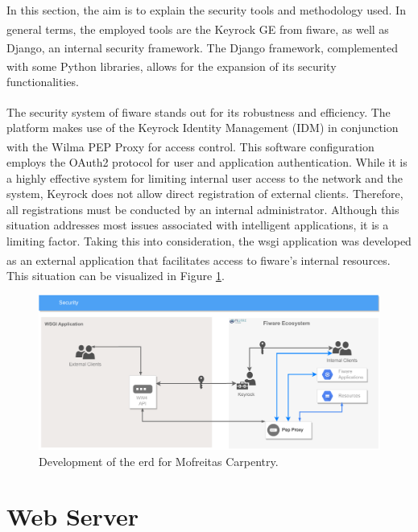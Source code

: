In this section, the aim is to explain the security tools and methodology used. In general terms, the employed tools are the Keyrock GE from \acrshort{fiware}\textsuperscript{\textregistered}, as well as Django\textsuperscript{\textregistered}, an internal security framework. The Django\textsuperscript{\textregistered} framework, complemented with some Python\textsuperscript{\textregistered} libraries, allows for the expansion of its security functionalities.

The security system of \acrshort{fiware}\textsuperscript{\textregistered} stands out for its robustness and efficiency. The platform makes use of the Keyrock Identity Management (IDM) in conjunction with the Wilma PEP Proxy\textsuperscript{\textregistered} for access control. This software configuration employs the OAuth2 protocol for user and application authentication. While it is a highly effective system for limiting internal user access to the network and the system, Keyrock does not allow direct registration of external clients. Therefore, all registrations must be conducted by an internal administrator. Although this situation addresses most issues associated with intelligent applications, it is a limiting factor. Taking this into consideration, the \acrshort{wsgi} application was developed as an external application that facilitates access to \acrshort{fiware}\textsuperscript{\textregistered}'s internal resources. This situation can be visualized in Figure \ref{fig:security}.


\begin{figure}[H]
    \centering
    \includegraphics[width=.95\linewidth]{images/Development/chap3/Security.pdf}
    \caption{Development of the \acrfull{erd} for Mofreitas Carpentry.}
    \label{fig:security}
\end{figure}


\section{Web Server}\label{section:fileSharing-webserver}

